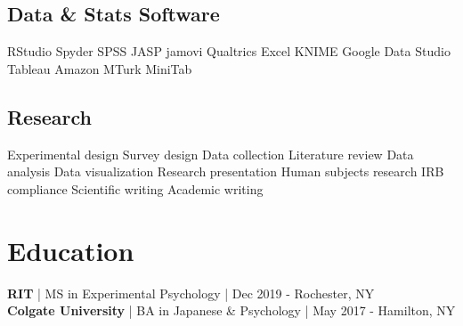 \documentclass[letterpaper]{deedy-resume_sm} %
\begin{document}
\subsection{Data \& Stats Software}
RStudio \textbullet{} Spyder \textbullet{} SPSS \textbullet{} JASP \textbullet{} jamovi \textbullet{} Qualtrics \textbullet{} Excel \textbullet{} KNIME \textbullet{} Google Data Studio \textbullet{} Tableau \textbullet{} Amazon MTurk \textbullet{} MiniTab
\subsection{Research}
Experimental design \textbullet{} Survey design \textbullet{} Data collection \textbullet{} Literature review \textbullet{} Data analysis \textbullet{} Data visualization \textbullet{} Research presentation \textbullet{} Human subjects research \textbullet{} IRB compliance \textbullet{} Scientific writing  \textbullet{} Academic writing


\section{Education} 
\textbf{RIT} | MS in Experimental Psychology | Dec 2019 - Rochester, NY\\
\textbf{Colgate University} | BA in Japanese \& Psychology | May 2017 - Hamilton, NY\\
\end{document}
